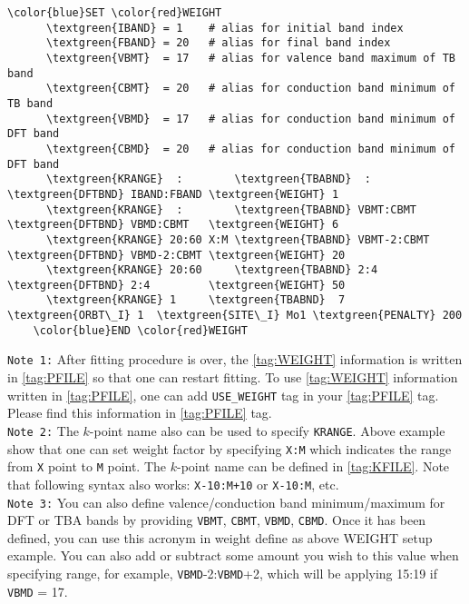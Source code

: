 \documentclass[a4paper,12pt]{scrartcl}
\newcommand{\textgreen}[1]{\textcolor{green!50!black}{\texttt{#1}}}
\begin{document}
\begin{description}
 \begin{Verbatim}[commandchars=\\\{\},gobble=4, frame=single, framesep=2mm, 
    label= WEIGHT setup example,
    labelposition=bottomline]
    \color{blue}SET \color{red}WEIGHT
      \textgreen{IBAND} = 1    # alias for initial band index
      \textgreen{FBAND} = 20   # alias for final band index
      \textgreen{VBMT}  = 17   # alias for valence band maximum of TB band
      \textgreen{CBMT}  = 20   # alias for conduction band minimum of TB band
      \textgreen{VBMD}  = 17   # alias for conduction band minimum of DFT band
      \textgreen{CBMD}  = 20   # alias for conduction band minimum of DFT band
      \textgreen{KRANGE}  :        \textgreen{TBABND}  :          \textgreen{DFTBND} IBAND:FBAND \textgreen{WEIGHT} 1
      \textgreen{KRANGE}  :        \textgreen{TBABND} VBMT:CBMT   \textgreen{DFTBND} VBMD:CBMT   \textgreen{WEIGHT} 6 
      \textgreen{KRANGE} 20:60 X:M \textgreen{TBABND} VBMT-2:CBMT \textgreen{DFTBND} VBMD-2:CBMT \textgreen{WEIGHT} 20
      \textgreen{KRANGE} 20:60     \textgreen{TBABND} 2:4         \textgreen{DFTBND} 2:4         \textgreen{WEIGHT} 50
      \textgreen{KRANGE} 1     \textgreen{TBABND}  7    \textgreen{ORBT\_I} 1  \textgreen{SITE\_I} Mo1 \textgreen{PENALTY} 200
    \color{blue}END \color{red}WEIGHT
 \end{Verbatim}

 \texttt{Note 1:} After fitting procedure is over, the \ref{tag:WEIGHT} information is 
 written in \ref{tag:PFILE} so that one can restart fitting. To use \ref{tag:WEIGHT} information written in \ref{tag:PFILE}, one can add \texttt{USE\_WEIGHT} tag in your \ref{tag:PFILE} tag. Please find this information in \ref{tag:PFILE} tag. \\
 \texttt{Note 2:} The $k$-point name also can be used to specify \texttt{KRANGE}. Above example show that one can set weight factor by specifying     \texttt{X:M} which indicates the range from \texttt{X} point to \texttt{M} point. The $k$-point name can be defined in \ref{tag:KFILE}. Note that following syntax also works: \texttt{X-10:M+10} or  \texttt{X-10:M}, etc. \\
  \texttt{Note 3:} You can also define valence/conduction band minimum/maximum for DFT or TBA bands by providing  \texttt{VBMT}, \texttt{CBMT}, \texttt{VBMD}, \texttt{CBMD}. Once it has been defined, you can use this acronym in weight define as above WEIGHT setup example. You can also add or subtract some amount you wish to this value when specifying range, for example, \texttt{VBMD}-2:\texttt{VBMD}+2, which will be applying 15:19 if \texttt{VBMD} = 17.    
  


\end{description}
\end{document}
